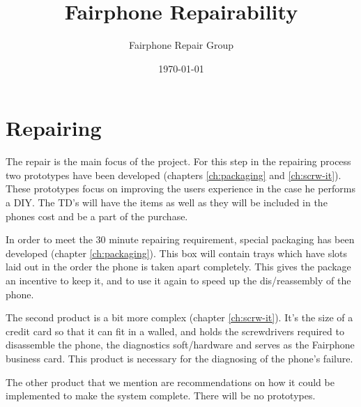 \documentclass[final,a4paper]{report} %
\author{Fairphone Repair Group}
\title{Fairphone Repairability}
\date{\today}
\begin{document}
	\section{Repairing}
	\label{sec:storyboard-repairing}
The repair is the main focus of the project. For this step in the repairing process two prototypes have been developed (chapters \ref{ch:packaging} and \ref{ch:scrw-it}). These prototypes focus on improving the users experience in the case he performs a DIY. The TD's will have the items as well as they will be included in the phones cost and be a part of the purchase.

In order to meet the 30 minute repairing requirement, special packaging has been developed (chapter \ref{ch:packaging}). This box will contain trays which have slots laid out in the order the phone is taken apart completely. This gives the package an incentive to keep it, and to use it again to speed up the dis/reassembly of the phone.

The second product is a bit more complex (chapter \ref{ch:scrw-it}). It's the size of a credit card so that it can fit in a walled, and holds the screwdrivers required to disassemble the phone, the diagnostics soft/hardware and serves as the Fairphone business card. This product is necessary for the diagnosing of the phone's failure.

The other product that we mention are recommendations on how it could be implemented to make the system complete. There will be no prototypes. 
\end{document}
